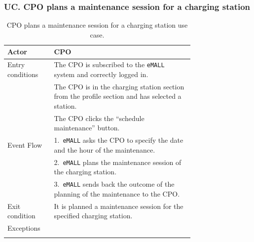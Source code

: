 \subsubsection*{UC\cuc . CPO plans a maintenance session for a charging station}
\begin{center}
    \begin{longtable}{lp{0.75\linewidth}}
        \hline
        Actor            & CPO                                                                                             \\
        \hline
        Entry conditions & The CPO is subscribed to the \verb|eMALL| system and correctly logged in.                              \\
        & The CPO is in the charging station section from the profile section and has selected a station. \\
        & The CPO clicks the ``schedule maintenance'' button.                                             \\
        \hline
        Event Flow       & 1.\ \verb|eMALL| asks the CPO to specify the date and the hour of the maintenance.                     \\
        & 2.\ \verb|eMALL| plans the maintenance session of the charging station.                                \\
        & 3.\ \verb|eMALL| sends back the outcome of the planning of the maintenance to the CPO.                 \\
        \hline
        Exit condition   & It is planned a maintenance session for the specified charging station.                         \\
        \hline
        Exceptions       &                                                                                                 \\
        \hline
        \caption{CPO plans a maintenance session for a charging station use case.}
        \label{tab: CPO_plans_maintenance_use_case}
    \end{longtable}

\end{center}

